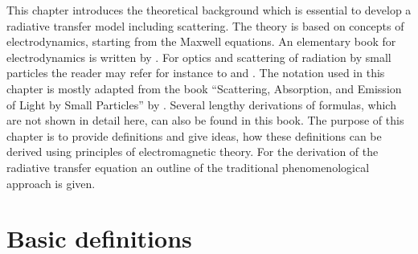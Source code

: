  This chapter introduces the theoretical background which is essential
 to develop a radiative transfer model including scattering. The theory
 is based on concepts of electrodynamics, starting from the Maxwell
 equations.  An elementary book for electrodynamics is written by
 \citet{jackson98:_class}.  For optics and scattering of radiation by
 small particles the reader may refer for instance to
 \citet{hulst57:_light_scatt_small} and \citet{bohren:98}. The notation
 used in this chapter is mostly adapted from the book ``Scattering,
 Absorption, and Emission of Light by Small Particles'' by
 \citet{Mishchenko:02}. Several lengthy derivations of formulas, which
 are not shown in detail here, can also be found in this book. The
 purpose of this chapter is to provide definitions and give ideas, how
 these definitions can be derived using principles of electromagnetic
 theory. For the derivation of the radiative transfer equation an
 outline of the traditional phenomenological approach is given.
 
 \section{Basic definitions}
 \label{sec:rtetheory:theory_basics}
 
